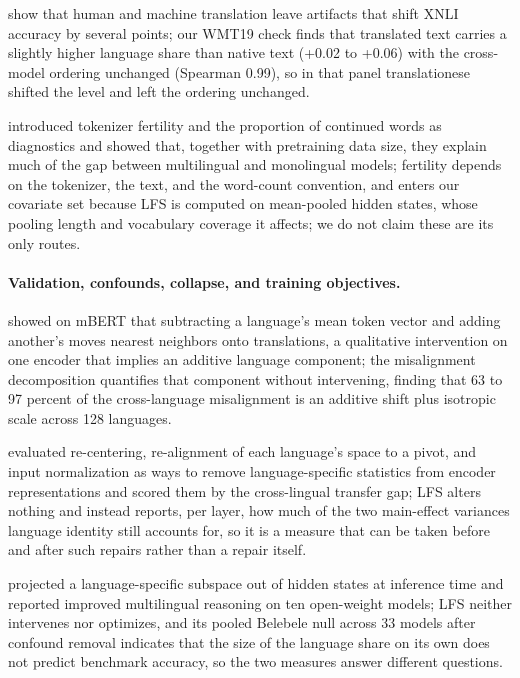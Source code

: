 \documentclass{article} %
\begin{document}
\citet{artetxe2020artifacts} show that human and machine translation leave artifacts that shift XNLI accuracy by several points; our WMT19 check finds that translated text carries a slightly higher language share than native text (+0.02 to +0.06) with the cross-model ordering unchanged (Spearman 0.99), so in that panel translationese shifted the level and left the ordering unchanged.

\citet{rust2021tokenizer} introduced tokenizer fertility and the proportion of continued words as diagnostics and showed that, together with pretraining data size, they explain much of the gap between multilingual and monolingual models; fertility depends on the tokenizer, the text, and the word-count convention, and enters our covariate set because LFS is computed on mean-pooled hidden states, whose pooling length and vocabulary coverage it affects; we do not claim these are its only routes.

\paragraph{Validation, confounds, collapse, and training objectives.}
\citet{gonen2020greek} showed on mBERT that subtracting a language's mean token vector and adding another's moves nearest neighbors onto translations, a qualitative intervention on one encoder that implies an additive language component; the misalignment decomposition quantifies that component without intervening, finding that 63 to 97 percent of the cross-language misalignment is an additive shift plus isotropic scale across 128 languages.

\citet{zhao2021inducing} evaluated re-centering, re-alignment of each language's space to a pivot, and input normalization as ways to remove language-specific statistics from encoder representations and scored them by the cross-lingual transfer gap; LFS alters nothing and instead reports, per layer, how much of the two main-effect variances language identity still accounts for, so it is a measure that can be taken before and after such repairs rather than a repair itself.

\citet{zhao2025disentanglement} projected a language-specific subspace out of hidden states at inference time and reported improved multilingual reasoning on ten open-weight models; LFS neither intervenes nor optimizes, and its pooled Belebele null across 33 models after confound removal indicates that the size of the language share on its own does not predict benchmark accuracy, so the two measures answer different questions.
\end{document}
